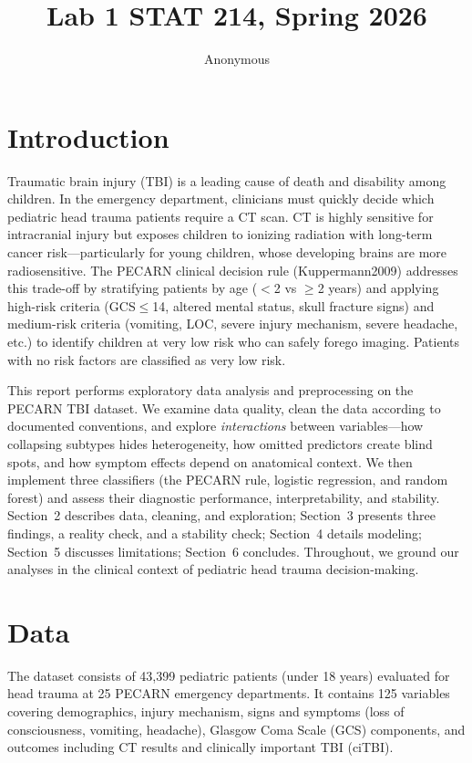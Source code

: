 \documentclass[11pt,letterpaper]{article}
\title{Lab 1 STAT 214, Spring 2026}
\author{Anonymous}
\begin{document}
\maketitle

\section{Introduction}\label{introduction}

Traumatic brain injury (TBI) is a leading cause of death and disability among children. In the emergency department, clinicians must quickly decide which pediatric head trauma patients require a CT scan. CT is highly sensitive for intracranial injury but exposes children to ionizing radiation with long-term cancer risk---particularly for young children, whose developing brains are more radiosensitive. The PECARN clinical decision rule (Kuppermann2009) addresses this trade-off by stratifying patients by age ($<$2 vs $\ge$2 years) and applying high-risk criteria (GCS$\le$14, altered mental status, skull fracture signs) and medium-risk criteria (vomiting, LOC, severe injury mechanism, severe headache, etc.) to identify children at very low risk who can safely forego imaging. Patients with no risk factors are classified as very low risk.

This report performs exploratory data analysis and preprocessing on the PECARN TBI dataset. We examine data quality, clean the data according to documented conventions, and explore \emph{interactions} between variables---how collapsing subtypes hides heterogeneity, how omitted predictors create blind spots, and how symptom effects depend on anatomical context. We then implement three classifiers (the PECARN rule, logistic regression, and random forest) and assess their diagnostic performance, interpretability, and stability. Section~2 describes data, cleaning, and exploration; Section~3 presents three findings, a reality check, and a stability check; Section~4 details modeling; Section~5 discusses limitations; Section~6 concludes. Throughout, we ground our analyses in the clinical context of pediatric head trauma decision-making.

\section{Data}\label{data}

The dataset consists of 43,399 pediatric patients (under 18 years) evaluated for head trauma at 25 PECARN emergency departments. It contains 125 variables covering demographics, injury mechanism, signs and symptoms (loss of consciousness, vomiting, headache), Glasgow Coma Scale (GCS) components, and outcomes including CT results and clinically important TBI (ciTBI).
\end{document}
